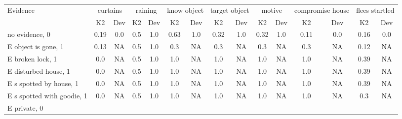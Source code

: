 \begin{table}\begin{tabular}{l|cc|cc|cc|cc|cc|cc|cc}\toprule\multirow{2}{*}{Evidence} & \multicolumn{2}{c}{curtains}& \multicolumn{2}{c}{raining}& \multicolumn{2}{c}{know object}& \multicolumn{2}{c}{target object}& \multicolumn{2}{c}{motive}& \multicolumn{2}{c}{compromise house}& \multicolumn{2}{c}{flees startled}\\& {K2} & {Dev}& {K2} & {Dev}& {K2} & {Dev}& {K2} & {Dev}& {K2} & {Dev}& {K2} & {Dev}& {K2} & {Dev}\\\midrule
no evidence, 0 & \cellcolor{Bittersweet}0.19&\cellcolor{Bittersweet}0.0&\cellcolor{Bittersweet}0.5&\cellcolor{Bittersweet}1.0&\cellcolor{Bittersweet}0.63&\cellcolor{Bittersweet}1.0&\cellcolor{Bittersweet}0.32&\cellcolor{Bittersweet}1.0&\cellcolor{Bittersweet}0.32&\cellcolor{Bittersweet}1.0&\cellcolor{Bittersweet}0.11&\cellcolor{Bittersweet}0.0&\cellcolor{Bittersweet}0.16&\cellcolor{Bittersweet}0.0\\E object is gone, 1 & \cellcolor{Bittersweet}0.13&\cellcolor{Bittersweet}NA&\cellcolor{Bittersweet}0.5&\cellcolor{Bittersweet}1.0&\cellcolor{Bittersweet}0.3&\cellcolor{Bittersweet}NA&\cellcolor{Bittersweet}0.3&\cellcolor{Bittersweet}NA&\cellcolor{Bittersweet}0.3&\cellcolor{Bittersweet}NA&\cellcolor{Bittersweet}0.3&\cellcolor{Bittersweet}NA&\cellcolor{Bittersweet}0.12&\cellcolor{Bittersweet}NA\\E broken lock, 1 & \cellcolor{Bittersweet}0.0&\cellcolor{Bittersweet}NA&\cellcolor{Bittersweet}0.5&\cellcolor{Bittersweet}1.0&\cellcolor{Bittersweet}1.0&\cellcolor{Bittersweet}NA&\cellcolor{Bittersweet}1.0&\cellcolor{Bittersweet}NA&\cellcolor{Bittersweet}1.0&\cellcolor{Bittersweet}NA&\cellcolor{Bittersweet}1.0&\cellcolor{Bittersweet}NA&\cellcolor{Bittersweet}0.39&\cellcolor{Bittersweet}NA\\E disturbed house, 1 & \cellcolor{Bittersweet}0.0&\cellcolor{Bittersweet}NA&\cellcolor{Bittersweet}0.5&\cellcolor{Bittersweet}1.0&\cellcolor{Bittersweet}1.0&\cellcolor{Bittersweet}NA&\cellcolor{Bittersweet}1.0&\cellcolor{Bittersweet}NA&\cellcolor{Bittersweet}1.0&\cellcolor{Bittersweet}NA&\cellcolor{Bittersweet}1.0&\cellcolor{Bittersweet}NA&\cellcolor{Bittersweet}0.39&\cellcolor{Bittersweet}NA\\E s spotted by house, 1 & \cellcolor{Bittersweet}0.0&\cellcolor{Bittersweet}NA&\cellcolor{Bittersweet}0.5&\cellcolor{Bittersweet}1.0&\cellcolor{Bittersweet}1.0&\cellcolor{Bittersweet}NA&\cellcolor{Bittersweet}1.0&\cellcolor{Bittersweet}NA&\cellcolor{Bittersweet}1.0&\cellcolor{Bittersweet}NA&\cellcolor{Bittersweet}1.0&\cellcolor{Bittersweet}NA&\cellcolor{Bittersweet}0.39&\cellcolor{Bittersweet}NA\\E s spotted with goodie, 1 & \cellcolor{Bittersweet}0.0&\cellcolor{Bittersweet}NA&\cellcolor{Bittersweet}0.5&\cellcolor{Bittersweet}1.0&\cellcolor{Bittersweet}1.0&\cellcolor{Bittersweet}NA&\cellcolor{Bittersweet}1.0&\cellcolor{Bittersweet}NA&\cellcolor{Bittersweet}1.0&\cellcolor{Bittersweet}NA&\cellcolor{Bittersweet}1.0&\cellcolor{Bittersweet}NA&\cellcolor{Bittersweet}0.3&\cellcolor{Bittersweet}NA\\E private, 0 & 
\end{tabular}
\end{table}
